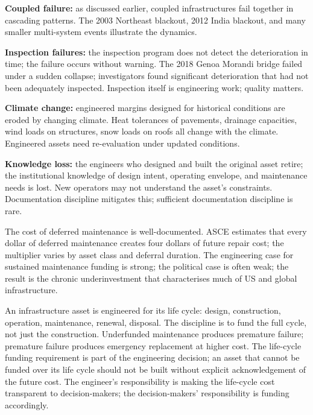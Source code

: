 \textbf{Coupled failure:} as discussed earlier, coupled infrastructures fail together in cascading patterns. The 2003 Northeast blackout, 2012 India blackout, and many smaller multi-system events illustrate the dynamics.

\textbf{Inspection failures:} the inspection program does not detect the deterioration in time; the failure occurs without warning. The 2018 Genoa Morandi bridge failed under a sudden collapse; investigators found significant deterioration that had not been adequately inspected. Inspection itself is engineering work; quality matters.

\textbf{Climate change:} engineered margins designed for historical conditions are eroded by changing climate. Heat tolerances of pavements, drainage capacities, wind loads on structures, snow loads on roofs all change with the climate. Engineered assets need re-evaluation under updated conditions.

\textbf{Knowledge loss:} the engineers who designed and built the original asset retire; the institutional knowledge of design intent, operating envelope, and maintenance needs is lost. New operators may not understand the asset's constraints. Documentation discipline mitigates this; sufficient documentation discipline is rare.

The cost of deferred maintenance is well-documented. ASCE estimates that every dollar of deferred maintenance creates four dollars of future repair cost; the multiplier varies by asset class and deferral duration. The engineering case for sustained maintenance funding is strong; the political case is often weak; the result is the chronic underinvestment that characterises much of US and global infrastructure.

\begin{principle}
An infrastructure asset is engineered for its life cycle: design, construction, operation, maintenance, renewal, disposal. The discipline is to fund the full cycle, not just the construction. Underfunded maintenance produces premature failure; premature failure produces emergency replacement at higher cost. The life-cycle funding requirement is part of the engineering decision; an asset that cannot be funded over its life cycle should not be built without explicit acknowledgement of the future cost. The engineer's responsibility is making the life-cycle cost transparent to decision-makers; the decision-makers' responsibility is funding accordingly.
\end{principle}

